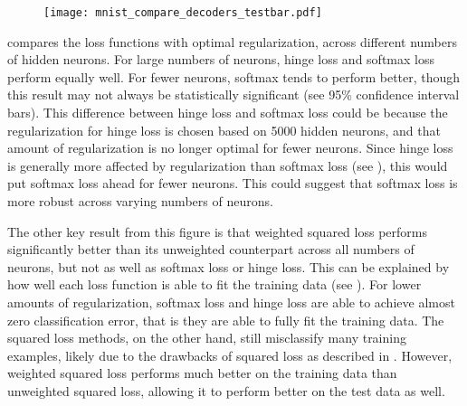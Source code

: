 \begin{figure}
  \centering
  \texttt{[image: mnist\_compare\_decoders\_testbar.pdf]}
\end{figure}

 compares the loss functions with optimal regularization,
across different numbers of hidden neurons.
For large numbers of neurons,
hinge loss and softmax loss perform equally well.
For fewer neurons, softmax tends to perform better,
though this result may not always be statistically significant
(see 95\% confidence interval bars).
This difference between hinge loss and softmax loss could be because
the regularization for hinge loss is chosen based on 5000 hidden neurons,
and that amount of regularization is no longer optimal for fewer neurons.
Since hinge loss is generally more affected by regularization than softmax loss
(see ), this would put softmax loss ahead for fewer neurons.
This could suggest that softmax loss is more robust
across varying numbers of neurons.

The other key result from this figure is that weighted squared loss
performs significantly better than its unweighted counterpart
across all numbers of neurons,
but not as well as softmax loss or hinge loss.
This can be explained by how well each loss function is able to
fit the training data (see ).
For lower amounts of regularization,
softmax loss and hinge loss are able to achieve almost zero classification error,
that is they are able to fully fit the training data.
The squared loss methods, on the other hand,
still misclassify many training examples,
likely due to the drawbacks of squared loss as described in .
However, weighted squared loss performs much better on the training data
than unweighted squared loss,
allowing it to perform better on the test data as well.


